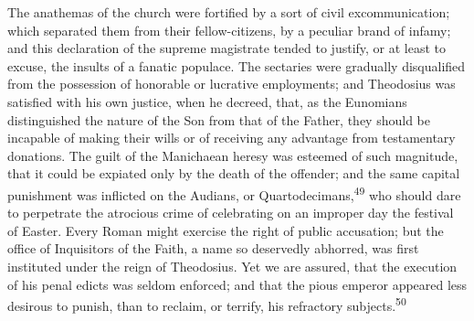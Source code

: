 The anathemas of the church were fortified by a sort of civil
excommunication; which separated them from their fellow-citizens,
by a peculiar brand of infamy; and this declaration of the
supreme magistrate tended to justify, or at least to excuse, the
insults of a fanatic populace. The sectaries were gradually
disqualified from the possession of honorable or lucrative
employments; and Theodosius was satisfied with his own justice,
when he decreed, that, as the Eunomians distinguished the nature
of the Son from that of the Father, they should be incapable of
making their wills or of receiving any advantage from
testamentary donations. The guilt of the Manichaean heresy was
esteemed of such magnitude, that it could be expiated only by the
death of the offender; and the same capital punishment was
inflicted on the Audians, or Quartodecimans,\textsuperscript{49} who should dare
to perpetrate the atrocious crime of celebrating on an improper
day the festival of Easter. Every Roman might exercise the right
of public accusation; but the office of Inquisitors of the Faith,
a name so deservedly abhorred, was first instituted under the
reign of Theodosius. Yet we are assured, that the execution of
his penal edicts was seldom enforced; and that the pious emperor
appeared less desirous to punish, than to reclaim, or terrify,
his refractory subjects.\textsuperscript{50}




